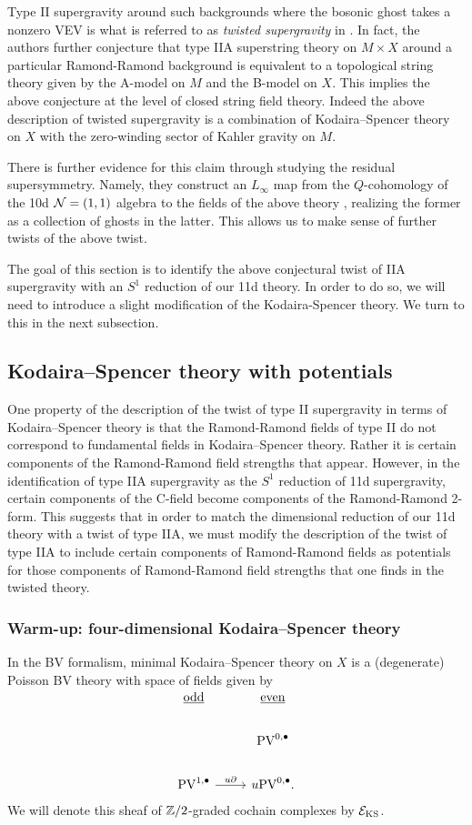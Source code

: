 \documentclass[11pt]{amsart}
\def\PV{{\rm PV}}
\begin{document}
Type II supergravity around such backgrounds where the bosonic ghost takes a nonzero VEV is what is referred to as {\em twisted supergravity} in \cite{CLsugra}.
In fact, the authors further conjecture that type IIA superstring theory on $M\times X$ around a particular Ramond-Ramond background is equivalent to a topological string theory given by the A-model on $M$ and the B-model on $X$.
This implies the above conjecture at the level of closed string field theory.
Indeed the above description of twisted supergravity is a combination of Kodaira--Spencer theory on $X$ with the zero-winding sector of Kahler gravity on $M$.

There is further evidence for this claim through studying the residual supersymmetry.
Namely, they construct an $L_{\infty}$ map from the $Q$-cohomology of the 10d $\mathcal N = (1,1)$ algebra to the fields of the above theory \cite{CLsugra}, realizing the former as a collection of ghosts in the latter. This allows us to make sense of further twists of the above twist.

The goal of this section is to identify the above conjectural twist of IIA supergravity with an $S^{1}$ reduction of our 11d theory. In order to do so, we will need to introduce a slight modification of the Kodaira-Spencer theory. We turn to this in the next subsection.

\subsection{Kodaira--Spencer theory with potentials}
\label{KSPot}

One property of the description of the twist of type II supergravity in terms of Kodaira--Spencer theory is that the Ramond-Ramond fields of type II do not correspond to fundamental fields in Kodaira--Spencer theory. Rather it is certain components of the Ramond-Ramond field strengths that appear. However, in the identification of type IIA supergravity as the $S^{1}$ reduction of 11d supergravity, certain components of the C-field become components of the Ramond-Ramond 2-form. This suggests that in order to match the dimensional reduction of our 11d theory with a twist of type IIA, we must modify the description of the twist of type IIA to include certain components of Ramond-Ramond fields as potentials for those components of Ramond-Ramond field strengths that one finds in the twisted theory.

\subsubsection{Warm-up: four-dimensional Kodaira--Spencer theory}
\label{sec:org91dc4ca}
In the BV formalism, minimal Kodaira--Spencer theory on $X$ is a (degenerate) Poisson BV theory with space of fields given by
\[
\begin{tikzcd}
\ul{\rm odd} & \ul{\rm even} \\
 & \PV^{0,\bu} \\
 \PV^{1,\bu} \ar[r, "u \partial"] & u \PV^{0,\bu} .
\end{tikzcd}
\]
We will denote this sheaf of $\mathbb Z /2$-graded cochain complexes by $\mathcal E_{\rm KS}$.
\end{document}
